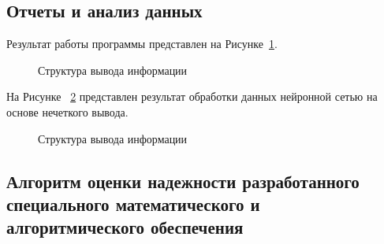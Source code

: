 \subsection{Отчеты и анализ данных}\label{subsec:ch3/sect2/sub3}
Результат работы программы представлен на Рисунке~\cref{fig:res}.
\begin{figure}[ht]
    \caption{Структура вывода информации}\label{fig:res}
\end{figure}
На Рисунке ~\cref{fig:res1} представлен результат обработки данных нейронной сетью на основе нечеткого вывода. 
\begin{figure}[ht]
    \caption{Структура вывода информации}\label{fig:res1}
\end{figure}
\subsection{Алгоритм оценки надежности разработанного специального математического и алгоритмического обеспечения}\label{sec:ch3/sect3/sub3}

